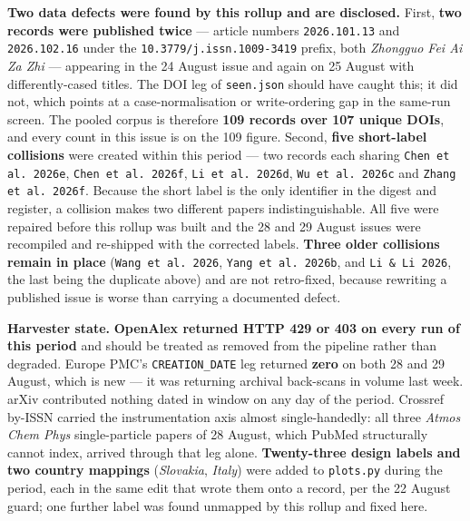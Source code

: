 \documentclass[10pt]{article}
\begin{document}
\vspace{1.2mm}
\textbf{Two data defects were found by this rollup and are disclosed.} First,
\textbf{two records were published twice} --- article numbers
\texttt{2026.101.13} and \texttt{2026.102.16} under the
\texttt{10.3779/j.issn.1009-3419} prefix, both \textit{Zhongguo Fei Ai Za Zhi} ---
appearing in the 24 August issue and again on 25 August with differently-cased titles. The
DOI leg of \texttt{seen.json} should have caught this; it did not, which points at a
case-normalisation or write-ordering gap in the same-run screen. The pooled corpus is
therefore \textbf{109 records over 107 unique DOIs}, and every count in this issue is on
the 109 figure. Second, \textbf{five short-label collisions} were created within this
period --- two records each sharing \texttt{Chen et al.\ 2026e},
\texttt{Chen et al.\ 2026f}, \texttt{Li et al.\ 2026d}, \texttt{Wu et al.\ 2026c} and
\texttt{Zhang et al.\ 2026f}. Because the short label is the only identifier in the digest
and register, a collision makes two different papers indistinguishable. All five were
repaired before this rollup was built and the 28 and 29 August issues were recompiled and
re-shipped with the corrected labels. \textbf{Three older collisions remain in place}
(\texttt{Wang et al.\ 2026}, \texttt{Yang et al.\ 2026b}, and \texttt{Li \& Li 2026},
the last being the duplicate above) and are not retro-fixed, because rewriting a published
issue is worse than carrying a documented defect.

\vspace{1.2mm}
\textbf{Harvester state.} \textbf{OpenAlex returned HTTP 429 or 403 on every run of this
period} and should be treated as removed from the pipeline rather than degraded. Europe
PMC's \texttt{CREATION\_DATE} leg returned \textbf{zero} on both 28 and 29 August, which
is new --- it was returning archival back-scans in volume last week. arXiv contributed
nothing dated in window on any day of the period. Crossref by-ISSN carried the
instrumentation axis almost single-handedly: all three \textit{Atmos Chem Phys}
single-particle papers of 28 August, which PubMed structurally cannot index, arrived
through that leg alone. \textbf{Twenty-three design labels and two country mappings}
(\textit{Slovakia}, \textit{Italy}) were added to \texttt{plots.py} during the period, each
in the same edit that wrote them onto a record, per the 22 August guard; one further label
was found unmapped by this rollup and fixed here.
\end{document}
